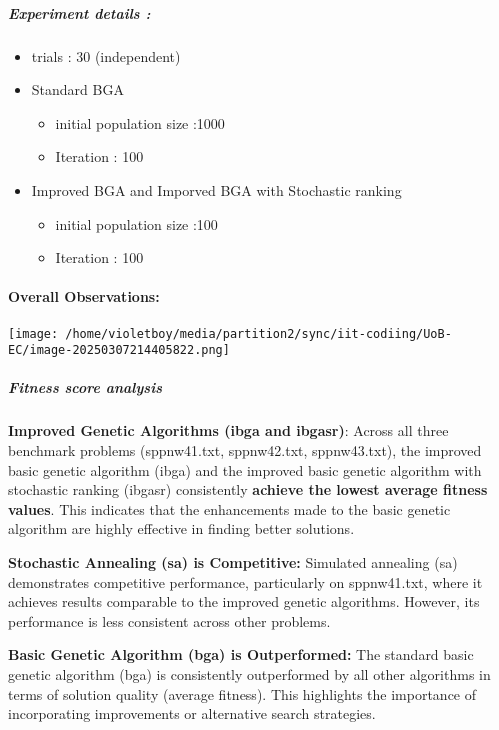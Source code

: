 \documentclass[
]{article}
\begin{document}
\subparagraph{Experiment details :}\label{experiment-details-}

\begin{itemize}
\item
  trials : 30 (independent)
\item
  Standard BGA

  \begin{itemize}
  \item
    initial population size :1000
  \item
    Iteration : 100
  \end{itemize}
\item
  Improved BGA and Imporved BGA with Stochastic ranking

  \begin{itemize}
  \item
    initial population size :100
  \item
    Iteration : 100
  \end{itemize}
\end{itemize}

\paragraph{Overall Observations:}\label{overall-observations}

\texttt{[image: /home/violetboy/media/partition2/sync/iit-codiing/UoB-EC/image-20250307214405822.png]}

\subparagraph{Fitness score analysis}\label{fitness-score-analysis}

\textbf{Improved Genetic Algorithms (ibga and ibgasr)}: Across all three
benchmark problems (sppnw41.txt, sppnw42.txt, sppnw43.txt), the improved
basic genetic algorithm (ibga) and the improved basic genetic algorithm
with stochastic ranking (ibgasr) consistently \textbf{achieve the lowest
average fitness values}. This indicates that the enhancements made to
the basic genetic algorithm are highly effective in finding better
solutions.

\textbf{Stochastic Annealing (sa) is Competitive:} Simulated annealing
(sa) demonstrates competitive performance, particularly on sppnw41.txt,
where it achieves results comparable to the improved genetic algorithms.
However, its performance is less consistent across other problems.

\textbf{Basic Genetic Algorithm (bga) is Outperformed:} The standard
basic genetic algorithm (bga) is consistently outperformed by all other
algorithms in terms of solution quality (average fitness). This
highlights the importance of incorporating improvements or alternative
search strategies.
\end{document}
